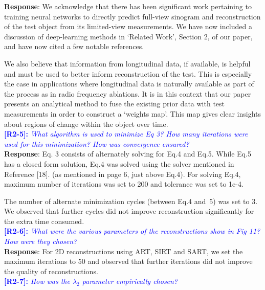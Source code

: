 \documentclass[11pt]{article}
\begin{document}
\textbf{Response}: We acknowledge that there has been significant work pertaining to training neural networks to directly predict full-view sinogram and reconstruction of the test object from its limited-view measurements. We have now included a discussion of deep-learning methods in `Related Work', Section 2, of our paper, and have now cited a few notable references.

We also believe that information from longitudinal data, if available, is helpful and must be used to better inform reconstruction of the test. This is especially the case in applications where longitudinal data is naturally available as part of the process as in radio frequency ablations. It is in this context that our paper presents an analytical method to fuse the existing prior data with test measurements in order to construct a `weights map'. This map gives clear insights about regions of change within the object over time.\\



\vspace{0.5cm}\textcolor{blue}{\textbf{[R2-5]:} \textit{What algorithm is used to minimize Eq 3? How many iterations were used for this minimization? How was convergence ensured?}}\\

\textbf{Response}: Eq. 3 consists of alternately solving for Eq.4 and Eq.5. While Eq.5 has a closed form solution, Eq.4 was solved using the solver mentioned in Reference [18]. (as mentioned in page 6, just above Eq.4). 
For solving Eq.4, maximum number of iterations was set to 200 and tolerance was set to 1e-4.

The number of alternate minimization cycles (between Eq.4 and~5) was set to 3. We observed that further cycles did not improve reconstruction significantly for the extra time consumed.
\\

\vspace{0.5cm}\textcolor{blue}{\textbf{[R2-6]:} \textit{What were the various parameters of the reconstructions show in Fig 11? How were they chosen?
}}\\

\textbf{Response}: For 2D reconstructions using ART, SIRT and SART, we set the maximum iterations to 50 and observed that further iterations did not improve the quality of reconstructions.\\

\vspace{0.5cm}\textcolor{blue}{\textbf{[R2-7]:} \textit{How was the $\lambda_2$ parameter empirically chosen?
}}\\
\end{document}

